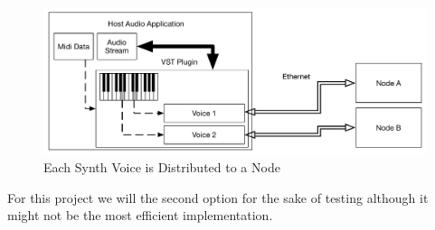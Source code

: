 \begin{figure}[H]
    \centering
    \includegraphics[width=\textwidth]{assets/distribute_byvoice.pdf}
    \caption{Each Synth Voice is Distributed to a Node}
    \label{fig:pervoice}
\end{figure}

For this project we will the second option for the sake of testing although it might not be the most efficient
implementation.